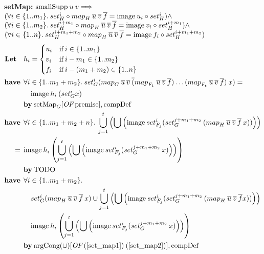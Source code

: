 \textbf{setMap:} $\text{smallSupp} \: u \: v \Longrightarrow$ \\
\hspace*{1.7em} $(\forall i \in \{1..m_1\}. \: set_H^i \circ {map}_{H} \: \overline{u} \: \overline{v} \: \overline{f} = \text{image} \: u_i \circ set_H^i) \wedge$ \\
\hspace*{1.7em} $(\forall i \in \{1..m_2\}. \: set_H^{i+m_1} \circ {map}_{H} \: \overline{u} \: \overline{v} \: \overline{f} = \text{image} \: v_i \circ set_H^{i+m_1}) \wedge$ \\
\hspace*{1.7em} $(\forall i \in \{1..n\}. \: set_H^{i+m_1+m_2} \circ {map}_{H} \: \overline{u} \: \overline{v} \: \overline{f} = \text{image} \: f_i \circ set_H^{i+m_1+m_2})$
\begin{align}
\textbf{Let} \quad & h_i = \begin{cases}
u_i & \text{if} \: i \in \{1..m_1\} \\
v_i & \text{if} \: i - m_1 \in \{1..m_2\} \\
f_i & \text{if} \: i - (m_1+m_2) \in \{1..n\}
\end{cases} \nonumber \\
\have & \forall i \in \{1..m_1+m_2\}. \: set_G^i (\map{G}{u}{v}(\map{F_1}{u}{v}{f})\dots(\map{F_t}{u}{v}{f}) \: x) = \nonumber \\*
 & \quad \text{image} \: h_i \: (set_G^i x) \label{set_map1} \\*
 & \by \OF{\text{setMap}_G}{\text{premise}}, \text{compDef} \nonumber \\
%
\have & \forall i \in \{1..m_1+m_2+n\}. \: \bigcup_{j=1}^t \left(\bigcup \left( \text{image} \: set_{F_j}^i (set_G^{j+m_1+m_2} \: (\map{H}{u}{v}{f} \: x)) \right) \right)\nonumber \\*
=\:\: & \text{image} \: h_i \left( \bigcup_{j=1}^t \left(\bigcup \left( \text{image} \: set_{F_j}^i (set_G^{j+m_1+m_2} \: x) \right) \right) \right) \label{set_map2} \\*
 & \by \text{TODO} \nonumber \\
%
\have & \forall i \in \{1..m_1+m_2\}. \nonumber \\*
& \quad set_G^i (\map{H}{u}{v}{f} \: x) \cup \bigcup_{j=1}^t \left(\bigcup \left( \text{image} \: set_{F_j}^i (set_G^{j+m_1+m_2} \: (\map{H}{u}{v}{f} x)) \right) \right) \nonumber \\*
& \quad \text{image} \: h_i \left( \bigcup_{j=1}^t \left(\bigcup \left( \text{image} \: set_{F_j}^i (set_G^{j+m_1+m_2} \: x) \right) \right) \right) \\*
 & \by \OF{\text{argCong}(\cup)}{(\ref{set_map1}) \: (\ref{set_map2})}, \text{compDef} \nonumber \\
%
\end{align}

